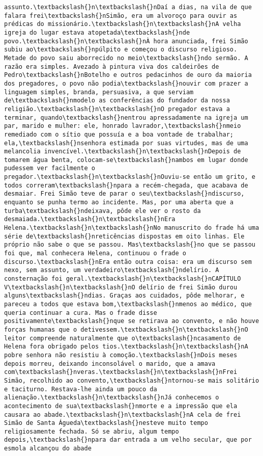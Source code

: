 \documentclass[11pt]{article}
\begin{document}
\begin{Verbatim}[commandchars=\\\{\}]
assunto.\textbackslash{}n\textbackslash{}nDaí a dias, na vila de que falara frei\textbackslash{}nSimão, era um alvoroço para ouvir as prédicas do missionário.\textbackslash{}n\textbackslash{}nA velha igreja do lugar estava atopetada\textbackslash{}nde povo.\textbackslash{}n\textbackslash{}nÀ hora anunciada, frei Simão subiu ao\textbackslash{}npúlpito e começou o discurso religioso. Metade do povo saiu aborrecido no meio\textbackslash{}ndo sermão. A razão era simples. Avezado à pintura viva dos caldeirões de Pedro\textbackslash{}nBotelho e outros pedacinhos de ouro da maioria dos pregadores, o povo não podia\textbackslash{}nouvir com prazer a linguagem simples, branda, persuasiva, a que serviam de\textbackslash{}nmodelo as conferências do fundador da nossa religião.\textbackslash{}n\textbackslash{}nO pregador estava a terminar, quando\textbackslash{}nentrou apressadamente na igreja um par, marido e mulher: ele, honrado lavrador,\textbackslash{}nmeio remediado com o sítio que possuía e a boa vontade de trabalhar; ela,\textbackslash{}nsenhora estimada por suas virtudes, mas de uma melancolia invencível.\textbackslash{}n\textbackslash{}nDepois de tomarem água benta, colocam-se\textbackslash{}nambos em lugar donde pudessem ver facilmente o pregador.\textbackslash{}n\textbackslash{}nOuviu-se então um grito, e todos correram\textbackslash{}npara a recém-chegada, que acabava de desmaiar. Frei Simão teve de parar o seu\textbackslash{}ndiscurso, enquanto se punha termo ao incidente. Mas, por uma aberta que a turba\textbackslash{}ndeixava, pôde ele ver o rosto da desmaiada.\textbackslash{}n\textbackslash{}nEra Helena.\textbackslash{}n\textbackslash{}nNo manuscrito do frade há uma série de\textbackslash{}nreticências dispostas em oito linhas. Ele próprio não sabe o que se passou. Mas\textbackslash{}no que se passou foi que, mal conhecera Helena, continuou o frade o discurso.\textbackslash{}nEra então outra coisa: era um discurso sem nexo, sem assunto, um verdadeiro\textbackslash{}ndelírio. A consternação foi geral.\textbackslash{}n\textbackslash{}nCAPÍTULO V\textbackslash{}n\textbackslash{}nO delírio de frei Simão durou alguns\textbackslash{}ndias. Graças aos cuidados, pôde melhorar, e pareceu a todos que estava bom,\textbackslash{}nmenos ao médico, que queria continuar a cura. Mas o frade disse positivamente\textbackslash{}nque se retirava ao convento, e não houve forças humanas que o detivessem.\textbackslash{}n\textbackslash{}nO leitor compreende naturalmente que o\textbackslash{}ncasamento de Helena fora obrigado pelos tios.\textbackslash{}n\textbackslash{}nA pobre senhora não resistiu à comoção.\textbackslash{}nDois meses depois morreu, deixando inconsolável o marido, que a amava com\textbackslash{}nveras.\textbackslash{}n\textbackslash{}nFrei Simão, recolhido ao convento,\textbackslash{}ntornou-se mais solitário e taciturno. Restava-lhe ainda um pouco da alienação.\textbackslash{}n\textbackslash{}nJá conhecemos o acontecimento de sua\textbackslash{}nmorte e a impressão que ela causara ao abade.\textbackslash{}n\textbackslash{}nA cela de frei Simão de Santa Águeda\textbackslash{}nesteve muito tempo religiosamente fechada. Só se abriu, algum tempo depois,\textbackslash{}npara dar entrada a um velho secular, que por esmola alcançou do abade 
\end{Verbatim}
\end{document}

